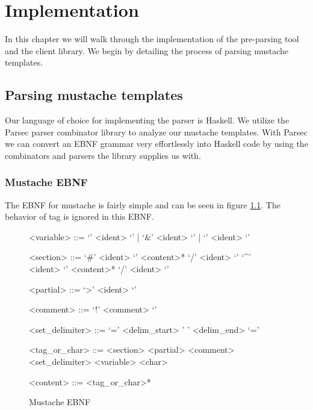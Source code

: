 \documentclass[thesis.tex]{subfiles}
\begin{document}
\chapter{Implementation}
\label{chap:impl}

In this chapter we will walk through the implementation of the pre-parsing tool
and the client library. We begin by detailing the process of parsing
mustache templates.

\section{Parsing mustache templates}

Our language of choice for implementing the parser is Haskell.
We utilize the Parsec parser combinator library to analyze our mustache
templates. With Parsec we can convert an EBNF grammar very effortlessly
into Haskell code by using the combinators and parsers the library supplies
us with.

\subsection{Mustache EBNF}
The EBNF for mustache is fairly simple and can be seen in figure
\ref{fig:mustache.ebnf}.
The behavior of  tag is ignored in this EBNF.

\begin{figure}
	\centering
	\setlength{\grammarindent}{3.5cm}
	\begin{grammar}
<variable> ::= `{{{' <ident> `}}}' | `{{&' <ident> `}}' | `{{' <ident> `}}'

<section> ::= `{{#' <ident> `}}' <content>* `{{/' <ident> `}}'
         \alt `{{^' <ident> `}}' <content>* `{{/' <ident> `}}'

<partial> ::= `{{>' <ident> `}}'

<comment> ::= `{{!' <comment> `}}'

<set\_delimiter> ::= `{{=' <delim\_start>  ' ' <delim\_end> `=}}'

<tag\_or\_char> ::= <section>
               \alt <partial>
               \alt <comment>
               \alt <set\_delimiter>
               \alt <variable>
               \alt <char>

<content> ::= <tag\_or\_char>*
	\end{grammar}
	\caption{Mustache EBNF}
	\label{fig:mustache.ebnf}
\end{figure}
\end{document}
